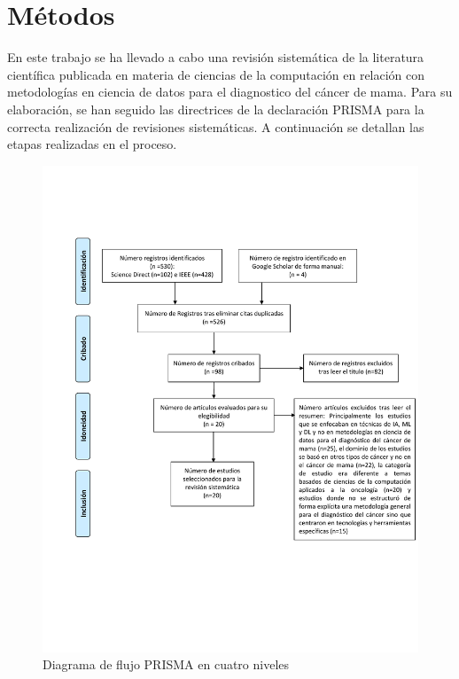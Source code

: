 \section{Métodos}
En este trabajo se ha llevado a cabo una revisión sistemática de la literatura científica publicada en materia de ciencias de la computación en relación con metodologías en ciencia de datos para el diagnostico del cáncer de mama. Para su elaboración, se han seguido las directrices de la declaración PRISMA \citep{Moher2009} para la correcta realización de revisiones sistemáticas. A continuación se detallan las etapas realizadas en el proceso.
\begin{figure}[h!]
	\centering
	\includegraphics[width=1
	\linewidth]{IMAGENES/PRISMA_DIAGRAM}
	\caption{Diagrama de flujo PRISMA en cuatro niveles }
	\label{Diagrama_Prisma}
\end{figure}

